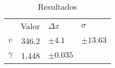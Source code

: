\begin{table}
  \centering
  \caption{Resultados}
    \begin{tabular}{|l|r|l|r|}
    \hline
    \rowcolor[rgb]{ .788,  .788,  .788} \multicolumn{4}{|c|}{\textsc{Resultados}} \bigstrut\\
    \hline
    \rowcolor[rgb]{ .929,  .929,  .929}       & \multicolumn{1}{l|}{Valor} & $\Delta x$ & \multicolumn{1}{l|}{$\sigma$} \bigstrut\\
    \hline
    \rowcolor[rgb]{ .929,  .929,  .929} $v$   & \cellcolor[rgb]{ 1,  1,  1}346.2 & \cellcolor[rgb]{ 1,  1,  1}$\pm4.1$ & \multicolumn{1}{l|}{\cellcolor[rgb]{ 1,  1,  1}$\pm13.63$} \bigstrut\\
    \hline
    \rowcolor[rgb]{ .929,  .929,  .929} $\gamma$ & \cellcolor[rgb]{ 1,  1,  1}1.448 & \cellcolor[rgb]{ 1,  1,  1}$\pm0.035$ & \cellcolor[rgb]{ 0,  0,  0} \bigstrut\\
    \hline
    \end{tabular}%
  \label{tab:results}%
\end{table}%